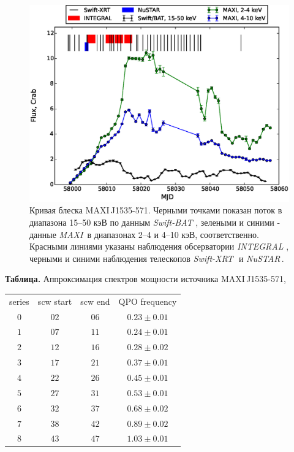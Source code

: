 \documentclass{pazhb}
\def\maxisrc{MAXI\,J1535-571}
\def\maxi{{\em MAXI}}
\def\swiftx{{\em Swift-XRT\,}}
\def\swiftb{{\em Swift-BAT\,}}
\def\nustar{{\em NuSTAR\,}}
\def\integral{{\em INTEGRAL\,}}
\begin{document}
\begin{figure}
\centerline{\includegraphics[scale=0.75]{overall_lc_v02.eps}}
\caption{Кривая блеска \maxisrc. Черными точками показан поток в диапазона 15--50 кэВ по данным \swiftb\,, зелеными и синими - данные \maxi\, в диапазонах 2--4 и 4--10 кэВ, соответственно. Красными линиями указаны наблюдения обсерватории \integral\,, черными и синими наблюдения телескопов \swiftx\, и \nustar. }
\label{fig:lc}
\end{figure} 

\begin{table}[t]

\vspace{6mm}
\centering
{{\bf Таблица.} Аппроксимация спектров мощности
источника \mbox{MAXI\,J1535-571},\protect\\}

\vspace{5mm}\begin{tabular}{c|c|c|c} \hline\hline
series & scw start & scw end & QPO frequency\\
$0$ & $02$ & $06$ & $0.23\pm 0.01 $ \\
$1$ & $07$ & $11$ & $0.24\pm 0.01 $ \\
$2$ & $12$ & $16$ & $0.28\pm 0.02 $ \\
$3$ & $17$ & $21$ & $0.37\pm 0.01 $ \\
$4$ & $22$ & $26$ & $0.45\pm 0.01 $ \\
$5$ & $27$ & $31$ & $0.53\pm 0.01 $ \\
$6$ & $32$ & $37$ & $0.68\pm 0.02 $ \\
$7$ & $38$ & $42$ & $0.89\pm 0.02 $ \\
$8$ & $43$ & $47$ & $1.03\pm 0.01 $ \\
\hline

\end{tabular}
\end{table}







\acknowledgements

\label{lastpage}




\end{document}
